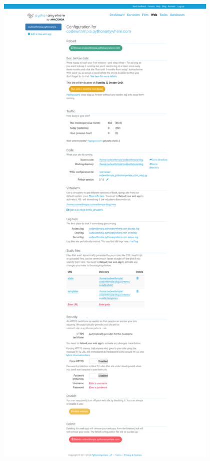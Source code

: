 \documentclass[a4paper,11pt]{article}
\begin{document}
        \includegraphics[width=0.8\textwidth]{PUBLICATION/screen14.png}
        
\end{document}
